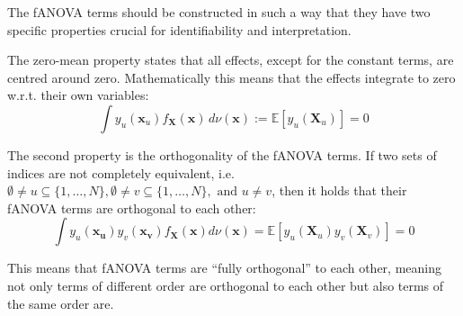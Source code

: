 The fANOVA terms should be constructed in such a way that they have two specific properties crucial for identifiability and interpretation.
\begin{proposition}
    The zero-mean property states that all effects, except for the constant terms, are centred around zero.
Mathematically this means that the effects integrate to zero w.r.t. their own variables:
\begin{equation}
    \int y_u(\boldsymbol{x}_u) f_{\boldsymbol{X}}(\boldsymbol{x}) \, d\nu (\boldsymbol{x}) := \mathbb{E}[y_u(\boldsymbol{X}_u)] = 0
    \label{eq:zero_mean_c}
\end{equation}
\end{proposition}
\begin{proposition}
    The second property is the orthogonality of the fANOVA terms. If two sets of indices are not completely equivalent, i.e. $\emptyset \neq u \subseteq \{1, \dots, N\}, \emptyset \neq v \subseteq \{1, \dots, N\}, \text{ and } u \neq v$, then it holds that their fANOVA terms are orthogonal to each other:
\begin{equation}
    \int y_u(\boldsymbol{x_u}) y_v(\boldsymbol{x_v}) f_{\boldsymbol{X}}(\boldsymbol{x}) d\nu (\boldsymbol{x}) = \mathbb{E}[y_u(\boldsymbol{X}_u) y_v(\boldsymbol{X}_v)] = 0
    \label{eq:orthogonality_c}
\end{equation}
\end{proposition}
This means that fANOVA terms are ``fully orthogonal'' to each other, meaning not only terms of different order are orthogonal to each other but also terms of the same order are.\par

